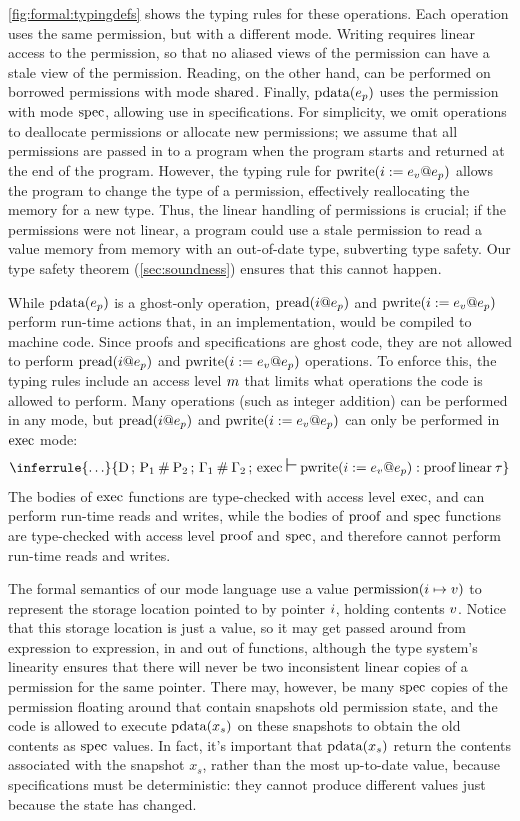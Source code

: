 \autoref{fig:formal:typingdefs} shows the typing rules for these operations.
Each operation uses the same permission,
but with a different mode.
Writing requires linear access to the permission,
so that no aliased views of the permission can have a stale view of the permission.
Reading, on the other hand, can be performed on borrowed permissions with mode $\textrm{shared}$.
Finally, $\textrm{pdata}(e_p)$ uses the permission with mode $\textrm{spec}$,
allowing use in specifications.
For simplicity, we omit operations to deallocate permissions or allocate new permissions;
we assume that all permissions are passed in to a program when the program starts and
returned at the end of the program.
However, the typing rule for $\textrm{pwrite}(i := e_v @ e_p)$ allows the program to
change the type of a permission, effectively reallocating the memory for a new type.
Thus, the linear handling of permissions is crucial;
if the permissions were not linear, a program could use a stale permission to read
a value memory from memory with an out-of-date type, subverting type safety.
Our type safety theorem (\autoref{sec:soundness}) ensures that this cannot happen.

While $\textrm{pdata}(e_p)$ is a ghost-only operation,
$\textrm{pread}(i @ e_p)$ and $\textrm{pwrite}(i := e_v @ e_p)$ perform run-time actions that,
in an implementation, would be compiled to machine code.
Since proofs and specifications are ghost code,
they are not allowed to perform $\textrm{pread}(i @ e_p)$ and $\textrm{pwrite}(i := e_v @ e_p)$ operations.
To enforce this, the typing rules include an access level $m$
that limits what operations the code is allowed to perform.
Many operations (such as integer addition) can be performed in any mode,
but $\textrm{pread}(i @ e_p)$ and $\textrm{pwrite}(i := e_v @ e_p)$ can only be performed in $\textrm{exec}$ mode:
\[
\inferrule{
  \ldots
}{
  \ejudgment{\datadecls}{\heaptyp}{\envmerge{\penv_1}{\penv_2}}{\envmerge{\xenv_1}{\xenv_2}}{\exec}{\laxity}{\exprpwritei{\expr_v}{\expr_p}}{\modu{\prf}{\linear}}{\typ}
}
\]
The bodies of $\textrm{exec}$ functions are type-checked with access level $\textrm{exec}$,
and can perform run-time reads and writes,
while the bodies of $\textrm{proof}$ and $\textrm{spec}$ functions are type-checked with access level
$\textrm{proof}$ and $\textrm{spec}$, and therefore cannot perform run-time reads and writes.

The formal semantics of our mode language use a value $\textrm{permission}(i \mapsto v)$
to represent the storage location pointed to by pointer $i$,
holding contents $v$.
Notice that this storage location is just a value,
so it may get passed around from expression to expression,
in and out of functions,
although the type system's linearity ensures that there will never be two inconsistent linear copies
of a permission for the same pointer.
There may, however, be many $\textrm{spec}$ copies of the permission floating around that
contain snapshots old permission state,
and the code is allowed to execute $\textrm{pdata}(x_s)$ on these snapshots to obtain
the old contents as $\textrm{spec}$ values.
In fact, it's important that $\textrm{pdata}(x_s)$ return the contents associated with
the snapshot $x_s$,
rather than the most up-to-date value,
because specifications must be deterministic:
they cannot produce different values just because the state has changed.

